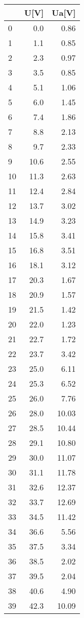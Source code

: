 \documentclass[a4paper,10pt]{article}
\begin{document}
\begin{tabular}{lrr}
\toprule
{} &  U[V] &  Ua[V] \\
\midrule
0  &   0.0 &   0.86 \\
1  &   1.1 &   0.85 \\
2  &   2.3 &   0.97 \\
3  &   3.5 &   0.85 \\
4  &   5.1 &   1.06 \\
5  &   6.0 &   1.45 \\
6  &   7.4 &   1.86 \\
7  &   8.8 &   2.13 \\
8  &   9.7 &   2.33 \\
9  &  10.6 &   2.55 \\
10 &  11.3 &   2.63 \\
11 &  12.4 &   2.84 \\
12 &  13.7 &   3.02 \\
13 &  14.9 &   3.23 \\
14 &  15.8 &   3.41 \\
15 &  16.8 &   3.51 \\
16 &  18.1 &   3.12 \\
17 &  20.3 &   1.67 \\
18 &  20.9 &   1.57 \\
19 &  21.5 &   1.42 \\
20 &  22.0 &   1.23 \\
21 &  22.7 &   1.72 \\
22 &  23.7 &   3.42 \\
23 &  25.0 &   6.11 \\
24 &  25.3 &   6.52 \\
25 &  26.0 &   7.76 \\
26 &  28.0 &  10.03 \\
27 &  28.5 &  10.44 \\
28 &  29.1 &  10.80 \\
29 &  30.0 &  11.07 \\
30 &  31.1 &  11.78 \\
31 &  32.6 &  12.37 \\
32 &  33.7 &  12.69 \\
33 &  34.5 &  11.42 \\
34 &  36.6 &   5.56 \\
35 &  37.5 &   3.34 \\
36 &  38.5 &   2.02 \\
37 &  39.5 &   2.04 \\
38 &  40.6 &   4.90 \\
39 &  42.3 &  10.09 \\

\end{tabular}
\end{document}
